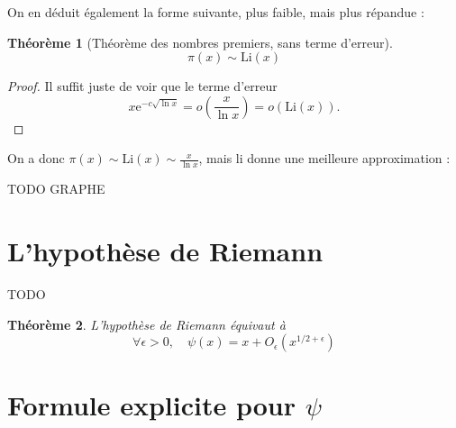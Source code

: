 \documentclass[french]{report}
\newtheorem{theorem}{Théorème}[section]
\begin{document}
On en déduit également la forme suivante, plus faible, mais plus répandue :

\begin{theorem}[Théorème des nombres premiers, sans terme d'erreur]\label{eq:tnp-equivalence}
  \[ \pi(x)\sim\mathrm{Li}(x) \]
\end{theorem}

\begin{proof}
  Il suffit juste de voir que le terme d'erreur
  \[
    x\mathrm{e}^{-c\sqrt{\ln x}}
    = o\left(\frac{x}{\ln x}\right)
    = o(\mathrm{Li}(x)).
  \]
\end{proof}

On a donc $\pi(x)\sim\mathrm{Li}(x)\sim\frac{x}{\ln x}$, mais $\mathrm{li}$ donne une meilleure approximation :

TODO GRAPHE

\section{L'hypothèse de Riemann}

TODO

\begin{theorem}
  L'hypothèse de Riemann équivaut à
  \[ \forall\epsilon>0,\quad\psi(x)=x+O_\epsilon(x^{1/2+\epsilon}) \]
\end{theorem}

\section{Formule explicite pour $\psi$}



% 
\end{document}
